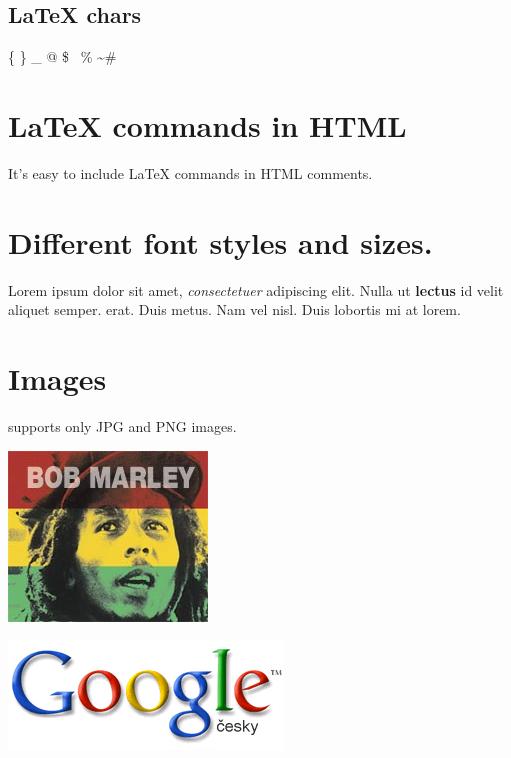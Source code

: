 \documentclass{article}
\begin{document}
\subsection{LaTeX chars}
\par \{ \} \_ \hat{} @ \$ \ \% \sim \#
\section{LaTeX commands in HTML}
\par It's easy to include LaTeX commands in HTML comments.

\section{Different font styles and sizes.}
\par Lorem ipsum {\fontsize{7}{8}\selectfont  dolor} sit amet, \textit{consectetuer} adipiscing elit.
 Nulla ut \textbf{lectus} id velit aliquet semper.  erat. Duis metus. Nam
 vel nisl. Duis {\fontsize{4}{5}\selectfont  lobortis} mi at {\fontsize{1}{1}\selectfont  lorem}.
\href{}{}
\section{Images}
\par 

 supports only JPG and PNG images.
\par \begin{center}\includegraphics{marley.jpg}\end{center}
\par \includegraphics{logo.png}
\end{document}
